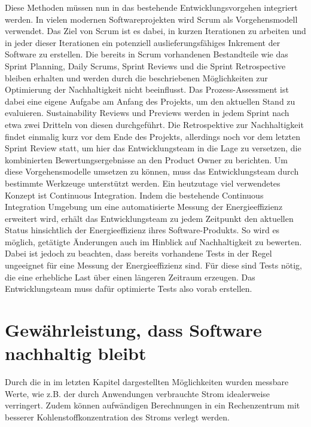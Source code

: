 \documentclass[utf8,biblatex]{lni}
\begin{document}
\newline
\newline
Diese Methoden müssen nun in das bestehende Entwicklungsvorgehen integriert werden. In vielen modernen Softwareprojekten wird Scrum als Vorgehensmodell verwendet. Das Ziel von Scrum ist es dabei, in kurzen Iterationen zu arbeiten und in jeder dieser Iterationen ein potenziell auslieferungsfähiges Inkrement der Software zu erstellen. Die bereits in Scrum vorhandenen Bestandteile wie das Sprint Planning, Daily Scrums, Sprint Reviews und die Sprint Retrospective bleiben erhalten und werden durch die beschriebenen Möglichkeiten zur Optimierung der Nachhaltigkeit nicht beeinflusst.
Das Prozess-Assessment ist dabei eine eigene Aufgabe am Anfang des Projekts, um den aktuellen Stand zu evaluieren. Sustainability Reviews und Previews werden in jedem Sprint nach etwa zwei Dritteln von diesen durchgeführt. Die Retrospektive zur Nachhaltigkeit findet einmalig kurz vor dem Ende des Projekts, allerdings noch vor dem letzten Sprint Review statt, um hier das Entwicklungsteam in die Lage zu versetzen, die kombinierten Bewertungsergebnisse an den Product Owner zu berichten. \cite{Dick13}
\newline
\newline
Um diese Vorgehensmodelle umsetzen zu können, muss das Entwicklungsteam durch bestimmte Werkzeuge unterstützt werden. Ein heutzutage viel verwendetes Konzept ist Continuous Integration. Indem die bestehende Continuous Integration Umgebung um eine automatisierte Messung der Energieeffizienz erweitert wird, erhält das Entwicklungsteam zu jedem Zeitpunkt den aktuellen Status hinsichtlich der Energieeffizienz ihres Software-Produkts. So wird es möglich, getätigte Änderungen auch im Hinblick auf Nachhaltigkeit zu bewerten. Dabei ist jedoch zu beachten, dass bereits vorhandene Tests in der Regel ungeeignet für eine Messung der Energieeffizienz sind. Für diese sind Tests nötig, die eine erhebliche Last über einen längeren Zeitraum erzeugen. Das Entwicklungsteam muss dafür optimierte Tests also vorab erstellen. \cite{Dick13}

\section{Gewährleistung, dass Software nachhaltig bleibt}
Durch die in im letzten Kapitel dargestellten Möglichkeiten wurden messbare Werte, wie z.B. der durch Anwendungen verbrauchte Strom idealerweise verringert. Zudem können aufwändigen Berechnungen in ein Rechenzentrum mit besserer Kohlenstoffkonzentration des Stroms verlegt werden.
\end{document}
